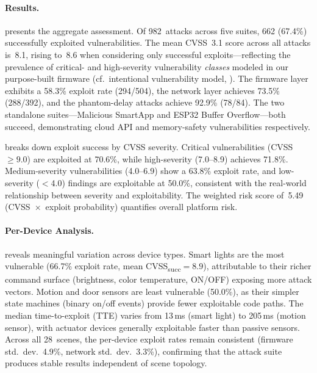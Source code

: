 \paragraph{Results.}



 presents the aggregate assessment.
Of 982~attacks across five suites, 662 (67.4\%) successfully
exploited vulnerabilities.
The mean CVSS~3.1 score across all attacks is~8.1, rising
to~8.6 when considering only successful exploits---reflecting
the prevalence of critical- and high-severity vulnerability
\emph{classes} modeled in our purpose-built firmware
(cf.\ intentional vulnerability model, ).
The firmware layer exhibits a 58.3\% exploit rate (294/504),
the network layer achieves 73.5\% (288/392), and the phantom-delay
attacks achieve 92.9\% (78/84).  The two standalone suites---Malicious
SmartApp and ESP32 Buffer Overflow---both succeed, demonstrating
cloud API and memory-safety vulnerabilities respectively.



 breaks down exploit success by CVSS
severity.  Critical vulnerabilities (CVSS~$\geq 9.0$) are exploited
at 70.6\%, while high-severity (7.0--8.9) achieves 71.8\%.
Medium-severity vulnerabilities (4.0--6.9) show a 63.8\%
exploit rate, and low-severity ($<$4.0) findings are exploitable
at 50.0\%, consistent with the real-world relationship between
severity and exploitability.  The weighted risk score of~5.49
(CVSS~$\times$~exploit probability) quantifies overall platform risk.



\paragraph{Per-Device Analysis.}
 reveals meaningful variation across
device types.  Smart lights are the most vulnerable (66.7\% exploit
rate, mean CVSS\textsubscript{succ}$= 8.9$), attributable to their
richer command surface (brightness, color temperature, ON/OFF)
exposing more attack vectors.  Motion and door sensors are least
vulnerable (50.0\%), as their simpler state machines
(binary on/off events) provide fewer exploitable code paths.
The median time-to-exploit (TTE) varies from 13\,ms (smart light)
to 205\,ms (motion sensor), with actuator devices generally
exploitable faster than passive sensors.
Across all 28~scenes, the per-device exploit rates remain consistent
(firmware std.\ dev.\ 4.9\%, network std.\ dev.\ 3.3\%), confirming
that the attack suite produces stable results independent of
scene topology.

